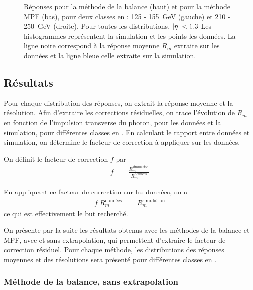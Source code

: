 \begin{figure}[p]
    \caption{Réponses pour la méthode de la balance (haut) et pour la méthode MPF (bas), pour deux classes en \pt : 125 - \SI{155}{\GeV} (gauche) et 210 - \SI{250}{\GeV} (droite). Pour toutes les distributions, $\lvert \eta \rvert < \num{1.3}$ Les histogrammes représentent la simulation et les points les données. La ligne noire correspond à la réponse moyenne $R_m$ extraite sur les données et la ligne bleue celle extraite sur la simulation.}
    \label{fig:responses_mpf_balancing}
\end{figure}

\clearpage

\subsection{Résultats}

Pour chaque distribution des réponses, on extrait la réponse moyenne et la résolution. Afin d'extraire les corrections résiduelles, on trace l'évolution de $R_m$ en fonction de l'impulsion transverse du photon, pour les données et la simulation, pour différentes classes en \aeta. En calculant le rapport entre données et simulation, on détermine le facteur de correction à appliquer sur les données.

On définit le facteur de correction $f$ par
\begin{align*}
  f &= \frac{R_m^{\text{simulation}}}{R_m^{\text{données}}}
\end{align*}

En appliquant ce facteur de correction sur les données, on a
\begin{align*}
  f\;R_m^{\text{données}} &= R_m^{\text{simulation}}
\end{align*}
ce qui est effectivement le but recherché.

\bigskip

On présente par la suite les résultats obtenus avec les méthodes de la balance et MPF, avec et sans extrapolation, qui permettent d'extraire le facteur de correction résiduel. Pour chaque méthode, les distributions des réponses moyennes et des résolutions sera présenté pour différentes classes en \aeta.

\subsubsection{Méthode de la balance, sans extrapolation}

